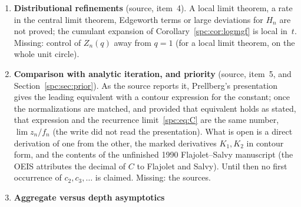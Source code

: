 \documentclass[11pt,letterpaper]{article}
\theoremstyle{definition}\newtheorem{definition}[theorem]{Definition}
\theoremstyle{remark}\newtheorem{remark}[theorem]{Remark}
\newcommand{\file}[1]{\nolinkurl{#1}}
\begin{document}
\begin{enumerate}
 \textup{[write, 9~October 2026, batch~138]} \emph{In part.} Part~IV of
 \file{a290354-iterated-euler-diagonals} (its Corollary~39.3,
 \file{ied:par:cor:marked}) proves, under the four inputs named in
 Question~\ref{spc:q:depth},
 $Z_n(q)\sim C(q)(n!)^2[2L(q)]^{-n}n^{-1-L(q)/3}$ for every real $q>0$,
 uniformly on compact positive $q$-intervals, with
 $C(q)=[2L(q)]^{L(q)/3}h(L(q))/(q+1)$ ($L(q)$ as here, $h$ as in that
 question). This $C(q)$ is positive on $q>0$, extends holomorphically to
 $\Re q>0$, and near $q=1$ is the $C(q)$ of Theorem~\ref{spc:thm:marked}, by
 the identity theorem. So the leading equivalent holds on the whole positive
 axis, and the analytic amplitude continues beyond the disk $|q-1|\le1/16$.
 Not given: the contraction or a fixed-order expansion beyond the disk, which
 that report asks for on neighbourhoods of positive compact intervals (its
 Section~48, Question~4, \file{ied:par:q:positive}); the zero set of $C(q)$
 on $\Re q>0$ (its Question~3, \file{ied:par:q:zeros}); and uniform complex
 asymptotics of $Z_n(q)$, which continuation of the amplitude alone does not
 give. Its Corollary~45.1 (\file{ied:par:cor:K}) expresses $K_1$ and $K_2$
 through $h(L)$, $h'(L)$ and $h''(L)$; no certified values follow (its
 Question~5).
\item\label{spc:q:distribution} \textbf{Distributional refinements} (source,
 item~4). A local limit theorem, a rate in the central limit theorem,
 Edgeworth terms or large deviations for $H_n$ are not proved; the cumulant
 expansion of Corollary~\ref{spc:cor:logmgf} is local in~$t$. Missing:
 control of $Z_n(q)$ away from $q=1$ (for a local limit theorem, on the whole
 unit circle).
\item\label{spc:q:analytic} \textbf{Comparison with analytic iteration, and
 priority} (source, item~5, and Section~\ref{spc:sec:prior}). As the
 source reports it, Prellberg's presentation~\cite{Prellberg} gives the
 leading equivalent with a contour expression for the constant; once the
 normalizations are matched, and provided that equivalent holds as stated,
 that expression and the recurrence limit~\eqref{spc:eq:C} are the same
 number, $\lim z_n/f_n$ (the write did not read the presentation). What is open is a direct derivation of one from
 the other, the marked derivatives
 $K_1,K_2$ in contour form, and the contents of the unfinished 1990
 Flajolet--Salvy manuscript (the OEIS attributes the decimal of $C$ to
 Flajolet and Salvy). Until then no first occurrence of $c_2,c_3,\dots$ is
 claimed. Missing: the sources.
\item\label{spc:q:depth} \textbf{Aggregate versus depth asymptotics}

\end{enumerate}
\end{document}
